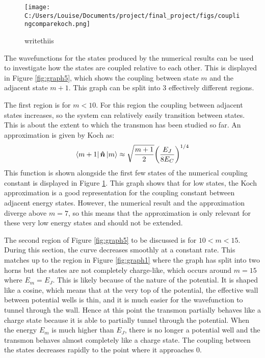\documentclass[11pt]{article}
\begin{document}
\begin{figure}[!ht]
\centering
\texttt{[image: C:/Users/Louise/Documents/project/final\_project/figs/couplingcomparekoch.png]}
\caption{writethiis}
\label{fig:graph7}
\end{figure}
The wavefunctions for the states produced by the numerical results can be used to investigate how the states are coupled relative to each other. This is displayed in Figure \ref{fig:graph5}, which shows the coupling between state $m$ and the adjacent state $m+1$. This graph can be split into 3 effectively different regions.

 The first region is for $m<10$. For this region the coupling between adjacent states increases, so the system can relatively easily transition between states. This is about the extent to which the transmon has been studied so far. An approximation is given by Koch as:
\begin{equation} \label{eq:10}
\bra{m+1}\boldsymbol{\hat{n}}\ket{m} \approx \sqrt{\frac{m+1}{2}} \bigg( \frac{E_J}{8E_C}\bigg)^{1/4}
\end{equation}
This function is shown alongside the first few states of the numerical coupling constant is displayed in Figure \ref{fig:graph7}. This graph shows that for low states, the Koch approximation is a good representation for the coupling constant between adjacent energy states. However, the numerical result and the approximation diverge above $m=7$, so this means that the approximation is only relevant for these very low energy states and should not be extended.

The second region of Figure \ref{fig:graph5} to be discussed is for $10<m<15$. During this section, the curve decreases smoothly at a constant rate. This matches up to the region in Figure \ref{fig:graph1} where the graph has split into two horns but the states are not completely charge-like, which occurs around $m=15$ where $E_m = E_J$. This is likely because of the nature of the potential. It is shaped like a cosine, which means that at the very top of the potential, the effective wall between potential wells is thin, and it is much easier for the wavefunction to tunnel through the wall. Hence at this point the transmon partially behaves like a charge state because it is able to partially tunnel through the potential. When the energy $E_m$ is much higher than $E_J$, there is no longer a potential well and the transmon behaves almost completely like a charge state. The coupling between the states decreases rapidly to the point where it approaches 0.
\end{document}
